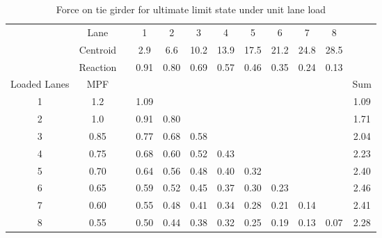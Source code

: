 \begin{table}[H]
\centering
\begin{tabular}{cccccccccccc}
\cline{2-11}
             & Lane     &  & 1    & 2    & 3    & 4    & 5    & 6    & 7    & 8    &      \\
             & Centroid &  & 2.9  & 6.6  & 10.2 & 13.9 & 17.5 & 21.2 & 24.8 & 28.5 &      \\
             & Reaction &  & 0.91 & 0.80 & 0.69 & 0.57 & 0.46 & 0.35 & 0.24 & 0.13 &      \\ \hline
Loaded Lanes & MPF      &  &      &      &      &      &      &      &      &      & Sum  \\ \hline
1            & 1.2      &  & 1.09 &      &      &      &      &      &      &      & 1.09 \\
2            & 1.0      &  & 0.91 & 0.80 &      &      &      &      &      &      & 1.71 \\
3            & 0.85     &  & 0.77 & 0.68 & 0.58 &      &      &      &      &      & 2.04 \\
4            & 0.75     &  & 0.68 & 0.60 & 0.52 & 0.43 &      &      &      &      & 2.23 \\
5            & 0.70     &  & 0.64 & 0.56 & 0.48 & 0.40 & 0.32 &      &      &      & 2.40 \\
6            & 0.65     &  & 0.59 & 0.52 & 0.45 & 0.37 & 0.30 & 0.23 &      &      & 2.46 \\
7            & 0.60     &  & 0.55 & 0.48 & 0.41 & 0.34 & 0.28 & 0.21 & 0.14 &      & 2.41 \\
8            & 0.55     &  & 0.50 & 0.44 & 0.38 & 0.32 & 0.25 & 0.19 & 0.13 & 0.07 & 2.28 \\ \hline
\end{tabular}
\caption{Force on tie girder for ultimate limit state under unit lane load}
\label{tab:app_ll_uls}
\end{table}